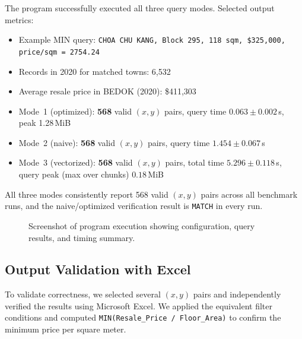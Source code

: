 \documentclass[11pt,a4paper]{article}
\begin{document}
The program successfully executed all three query modes. Selected output metrics:
\begin{itemize}[nosep]
    \item Example MIN query: \texttt{CHOA CHU KANG, Block 295, 118\,sqm, \$325,000, price/sqm = 2754.24}
    \item Records in 2020 for matched towns: 6,532
    \item Average resale price in BEDOK (2020): \$411,303
    \item Mode~1 (optimized): \textbf{568} valid $(x, y)$ pairs, query time $0.063 \pm 0.002$\,s, peak 1.28\,MiB
    \item Mode~2 (naive): \textbf{568} valid $(x, y)$ pairs, query time $1.454 \pm 0.067$\,s
    \item Mode~3 (vectorized): \textbf{568} valid $(x, y)$ pairs, total time $5.296 \pm 0.118$\,s, query peak (max over chunks) $0.18$\,MiB
\end{itemize}

All three modes consistently report 568 valid $(x, y)$ pairs across all benchmark runs, and the naive/optimized verification result is \texttt{MATCH} in every run.

\begin{figure}[H]
\centering
{}
\caption{Screenshot of program execution showing configuration, query results, and timing summary.}
\label{fig:exec}
\end{figure}

\subsection{Output Validation with Excel}

To validate correctness, we selected several $(x, y)$ pairs and independently verified the results using Microsoft Excel. We applied the equivalent filter conditions and computed \texttt{MIN(Resale\_Price / Floor\_Area)} to confirm the minimum price per square meter.
\end{document}
